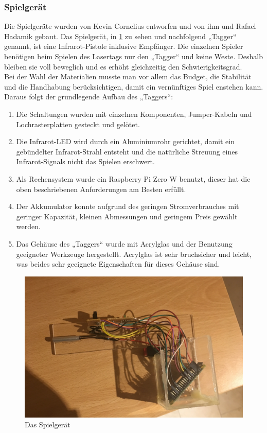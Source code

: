 \subsubsection{Spielgerät}
\label{sec:hardware-spielgeraet}

Die Spielgeräte wurden von Kevin Cornelius entworfen und von ihm und Rafael Hadamik gebaut.
Das Spielgerät, in \cref{fig:Bild1Hardware} zu sehen und nachfolgend „Tagger“ genannt, ist eine Infrarot-Pistole inklusive Empfänger. Die einzelnen Spieler benötigen beim Spielen des Lasertags nur den „Tagger“ und keine Weste. Deshalb bleiben sie voll beweglich und es erhöht gleichzeitig den Schwierigkeitsgrad. \\
Bei der Wahl der Materialien musste man vor allem das Budget, die Stabilität und die Handhabung berücksichtigen, damit ein vernünftiges Spiel enstehen kann. Daraus folgt der grundlegende Aufbau des „Taggers“:
\begin{enumerate}
	\item Die Schaltungen wurden mit einzelnen Komponenten, Jumper-Kabeln und Lochrasterplatten gesteckt und gelötet.
	\item Die Infrarot-LED wird durch ein Aluminiumrohr gerichtet, damit ein gebündelter Infrarot-Strahl entsteht und die natürliche Streuung eines Infrarot-Signals nicht das Spielen erschwert.
	\item Als Rechensystem wurde ein Raspberry Pi Zero W benutzt, dieser  hat die oben beschriebenen Anforderungen am Besten erfüllt.
	\item Der Akkumulator konnte aufgrund des geringen Stromverbrauches mit geringer Kapazität, kleinen Abmessungen und geringem Preis gewählt werden.
	\item Das Gehäuse des „Taggers“ wurde mit Acrylglas und der Benutzung geeigneter Werkzeuge hergestellt. Acrylglas ist sehr bruchsicher und leicht, was beides sehr geeignete Eigenschaften für dieses Gehäuse sind.
\end{enumerate}
\begin{figure}[h]
	\centering
		\includegraphics[width=0.7 \textwidth]{./040-komponenten/010-hardware/tagger.jpg}
	\caption{Das Spielgerät}
	\label{fig:Bild1Hardware}
\end{figure}

